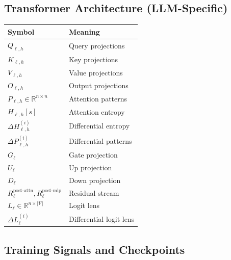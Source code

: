 \documentclass[11pt]{article}
\begin{document}
\subsection{Transformer Architecture (LLM-Specific)}
\label{app:notation-transformer-architecture}

\begin{center}
\begin{tabular}{ll}
\toprule
\textbf{Symbol} & \textbf{Meaning} \\
\midrule
$Q_{\ell,h}$ & Query projections \\
$K_{\ell,h}$ & Key projections \\
$V_{\ell,h}$ & Value projections \\
$O_{\ell,h}$ & Output projections \\
$P_{\ell,h} \in \mathbb{R}^{n \times n}$ & Attention patterns \\
$H_{\ell,h}[s]$ & Attention entropy \\
$\Delta H^{(i)}_{\ell,h}$ & Differential entropy \\
$\Delta P^{(i)}_{\ell,h}$ & Differential patterns \\
$G_\ell$ & Gate projection \\
$U_\ell$ & Up projection \\
$D_\ell$ & Down projection \\
$R^{\text{post-attn}}_\ell, R^{\text{post-mlp}}_\ell$ & Residual stream \\
$L_\ell \in \mathbb{R}^{n \times |\mathcal{V}|}$ & Logit lens \\
$\Delta L^{(i)}_\ell$ & Differential logit lens \\
\bottomrule
\end{tabular}
\end{center}

\subsection{Training Signals and Checkpoints}
\label{app:notation-training-signals-checkpoints}
\end{document}
